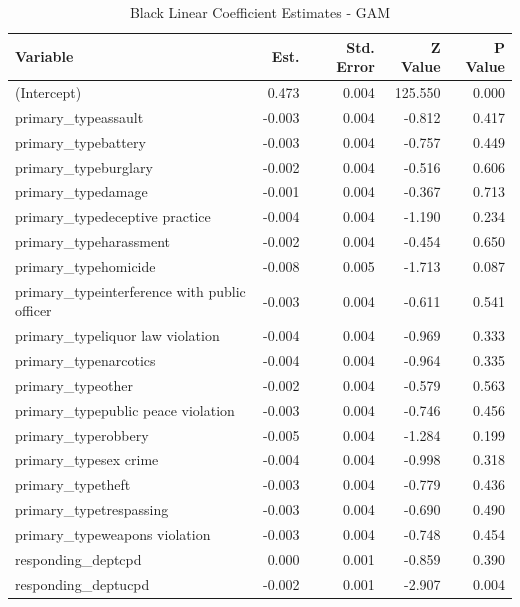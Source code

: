 \documentclass{ucetd}
\begin{document}
\begin{table}

\caption{\label{tab:black-gam}Black Linear Coefficient Estimates - GAM}
\centering
\begin{tabular}[t]{l|r|r|r|r}
\hline
Variable & Est. & Std. Error & Z Value & P Value\\
\hline
(Intercept) & 0.473 & 0.004 & 125.550 & 0.000\\
\hline
primary\_typeassault & -0.003 & 0.004 & -0.812 & 0.417\\
\hline
primary\_typebattery & -0.003 & 0.004 & -0.757 & 0.449\\
\hline
primary\_typeburglary & -0.002 & 0.004 & -0.516 & 0.606\\
\hline
primary\_typedamage & -0.001 & 0.004 & -0.367 & 0.713\\
\hline
primary\_typedeceptive practice & -0.004 & 0.004 & -1.190 & 0.234\\
\hline
primary\_typeharassment & -0.002 & 0.004 & -0.454 & 0.650\\
\hline
primary\_typehomicide & -0.008 & 0.005 & -1.713 & 0.087\\
\hline
primary\_typeinterference with public officer & -0.003 & 0.004 & -0.611 & 0.541\\
\hline
primary\_typeliquor law violation & -0.004 & 0.004 & -0.969 & 0.333\\
\hline
primary\_typenarcotics & -0.004 & 0.004 & -0.964 & 0.335\\
\hline
primary\_typeother & -0.002 & 0.004 & -0.579 & 0.563\\
\hline
primary\_typepublic peace violation & -0.003 & 0.004 & -0.746 & 0.456\\
\hline
primary\_typerobbery & -0.005 & 0.004 & -1.284 & 0.199\\
\hline
primary\_typesex crime & -0.004 & 0.004 & -0.998 & 0.318\\
\hline
primary\_typetheft & -0.003 & 0.004 & -0.779 & 0.436\\
\hline
primary\_typetrespassing & -0.003 & 0.004 & -0.690 & 0.490\\
\hline
primary\_typeweapons violation & -0.003 & 0.004 & -0.748 & 0.454\\
\hline
responding\_deptcpd & 0.000 & 0.001 & -0.859 & 0.390\\
\hline
responding\_deptucpd & -0.002 & 0.001 & -2.907 & 0.004\\
\hline
\end{tabular}
\end{table}
\end{document}
